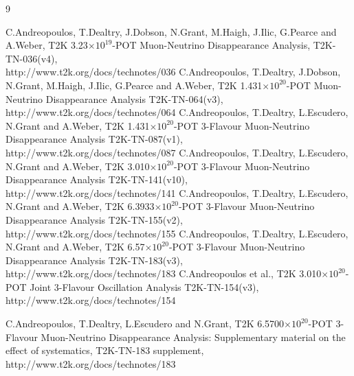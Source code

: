 %
%

\begin{thebibliography}{9}

%
%
   C.Andreopoulos, T.Dealtry, J.Dobson, N.Grant, M.Haigh, J.Ilic, G.Pearce and A.Weber,
   T2K 3.23$\times10^{19}$-POT Muon-Neutrino Disappearance Analysis,
   T2K-TN-036(v4),\\
   http://www.t2k.org/docs/technotes/036
   C.Andreopoulos, T.Dealtry, J.Dobson, N.Grant, M.Haigh, J.Ilic, G.Pearce and A.Weber,
   T2K 1.431$\times10^{20}$-POT Muon-Neutrino Disappearance Analysis
   T2K-TN-064(v3),\\
   http://www.t2k.org/docs/technotes/064
   C.Andreopoulos, T.Dealtry, L.Escudero, N.Grant and A.Weber,
   T2K 1.431$\times10^{20}$-POT 3-Flavour Muon-Neutrino Disappearance Analysis
   T2K-TN-087(v1),\\
   http://www.t2k.org/docs/technotes/087
   C.Andreopoulos, T.Dealtry, L.Escudero, N.Grant and A.Weber,
   T2K 3.010$\times10^{20}$-POT 3-Flavour Muon-Neutrino Disappearance Analysis
   T2K-TN-141(v10),\\
   http://www.t2k.org/docs/technotes/141
   C.Andreopoulos, T.Dealtry, L.Escudero, N.Grant and A.Weber,
   T2K 6.3933$\times10^{20}$-POT 3-Flavour Muon-Neutrino Disappearance Analysis
   T2K-TN-155(v2),\\
   http://www.t2k.org/docs/technotes/155
   C.Andreopoulos, T.Dealtry, L.Escudero, N.Grant and A.Weber,
   T2K 6.57$\times10^{20}$-POT 3-Flavour Muon-Neutrino Disappearance Analysis
   T2K-TN-183(v3),\\
   http://www.t2k.org/docs/technotes/183
   C.Andreopoulos et al.,
   T2K 3.010$\times10^{20}$-POT Joint 3-Flavour Oscillation Analysis
   T2K-TN-154(v3),\\
   http://www.t2k.org/docs/technotes/154

%
%
  C.Andreopoulos, T.Dealtry, L.Escudero and N.Grant,
  T2K 6.5700$\times10^{20}$-POT 3-Flavour Muon-Neutrino Disappearance Analysis:
  Supplementary material on the effect of systematics,
  T2K-TN-183 supplement,\\
  http://www.t2k.org/docs/technotes/183


\end{thebibliography}
